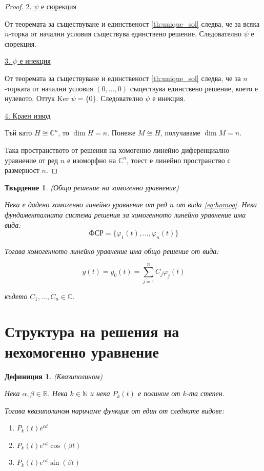 \documentclass{scrartcl}
\newtheorem{definition}{Дефиниция}
\newtheorem{statement}{Твърдение}
\begin{document}
\begin{FlushLeft}
\begin{proof}
\underline{2. $\psi$ е сюрекция}

От теоремата за съществуване и единственост \ref{th:unique_sol} следва, че за всяка $n$-торка от начални условия съществува единствено решение. Следователно $\psi$ е сюрекция.

\underline{3. $\psi$ е инекция}

От теоремата за съществуване и единственост \ref{th:unique_sol} следва, че за $n$-торката от начални условия $(0, \dots, 0)$ съществува единствено решение, което е нулевото. Оттук $\text{Ker }\psi = \{0\}$. Следователно $\psi$ е инекция.

\underline{4. Краен извод}

Тъй като $H \cong \mathbb{C}^n$, то $\dim H = n$. Понеже $M \cong H$, получаваме $\dim M = n$.

Така пространството от решения на хомогенно линейно диференциално уравнение от ред $n$ е изоморфно на $\mathbb{C}^n$, тоест е линейно пространство с размерност $n$.
\end{proof}

\begin{statement}\label{st:general_solution}
(Общо решение на хомогенно уравнение)

Нека е дадено хомогенно линейно уравнение от ред $n$ от вида \eqref{eq:homog}.
Нека фундаменталната система решения за хомогенното линейно уравнение има вида:
$$\text{ФСР} = \{\varphi_1(t), \dots, \varphi_n(t)\}$$

Тогава хомогенното линейно уравнение има общо решение от вида:

$$y(t) = y_0(t) = \sum_{j=1}^n C_j \varphi_j(t)$$

където $C_1, \dots, C_n \in \mathbb{C}$.
\end{statement}

\section{Структура на решения на нехомогенно уравнение}

\begin{definition}
(Квазиполином)

Нека $\alpha, \beta \in \mathbb{R}$. Нека $k \in \mathbb{N}$ и нека $P_k(t)$ е полином от $k$-та степен.

Тогава квазиполином наричаме функция от един от следните видове:

\begin{enumerate}
    \item $P_k(t)e^{\alpha t}$
    \item $P_k(t)e^{\alpha t}\cos{(\beta t)}$
    \item $P_k(t)e^{\alpha t}\sin{(\beta t)}$
\end{enumerate}
\end{definition}


\end{FlushLeft}
\end{document}

